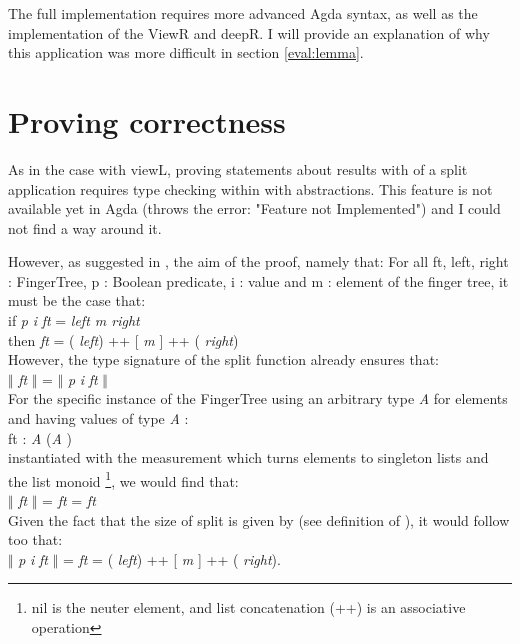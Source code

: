 \documentclass[12pt,twoside,notitlepage]{report}
\begin{document}
The full implementation requires more advanced Agda syntax, as well as the implementation of the ViewR and deepR. I will provide an explanation of why this application was more difficult in section \ref{eval:lemma}.

\section{Proving correctness}

As in the case with viewL, proving statements about results with of a split application requires type checking within with abstractions. This feature is not available yet in Agda (throws the error: "Feature not Implemented") and I could not find a way around it.

However, as suggested in \cite{coq}, the aim of the proof, namely that: For all ft, left, right : FingerTree, p : Boolean predicate, i : value and m : element of the finger tree, it must be the case that: \\
\indent\indent	if  \textit{p} \textit{i} \textit{ft} =  \textit{left m right} \\ 
\indent\indent 	then  \textit{ft}    = ( \textit{left}) ++ [ \textit{m} ] ++ ( \textit{right})\\
However, the type signature of the split function already ensures that:\\ 
\indent\indent $\Vert$ \textit{ft} $\Vert$ = $\Vert$ \textit{p} \textit{i}  \textit{ft} $\Vert$\\
For the specific instance of the FingerTree using an arbitrary type \textit{A} for elements and having values of type \textit{A} 	: \\
\indent\indent ft :  \textit{A} (\textit{A} ) \\
instantiated with the measurement which turns elements to singleton lists and the list monoid \footnote{nil is the neuter element, and list concatenation (++) is an associative operation}, we would find that: \\
\indent\indent $\Vert$ \textit{ft} $\Vert$ =  \AgdaFunction{\_++\_} \AgdaInductiveConstructor{[]} \textit{ft} =  \textit{ft} \\
Given the fact that the size of split is given by        (see definition of ), it would follow too that: \\
\indent\indent $\Vert$ \textit{p} \textit{i}  \textit{ft} $\Vert$ =  \textit{ft}    = ( \textit{left}) ++ [ \textit{m} ] ++ ( \textit{right}). 
\end{document}

